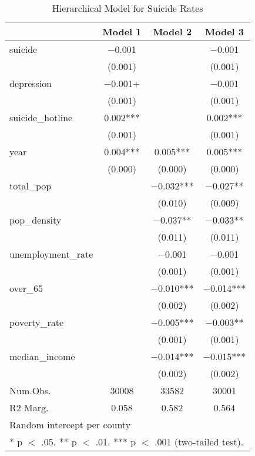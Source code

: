 \begin{table}[!h]

\caption{\label{tab:suicide_analysis}Hierarchical Model for Suicide Rates}
\centering
\fontsize{8}{10}\selectfont

\begin{tabular}{lccc}
\toprule
  & Model 1 & Model 2 & Model 3\\
\midrule

suicide & \num{-0.001} &  & \num{-0.001}\\
 & (\num{0.001}) &  & \vphantom{2} (\num{0.001})\\
depression & \num{-0.001}+ &  & \num{-0.001}\\
 & (\num{0.001}) &  & \vphantom{1} (\num{0.001})\\
suicide\_hotline & \num{0.002}*** &  & \num{0.002}***\\
 & (\num{0.001}) &  & (\num{0.001})\\
year & \num{0.004}*** & \num{0.005}*** & \num{0.005}***\\
 & (\num{0.000}) & (\num{0.000}) & (\num{0.000})\\
total\_pop &  & \num{-0.032}*** & \num{-0.027}**\\
 &  & (\num{0.010}) & (\num{0.009})\\
pop\_density &  & \num{-0.037}** & \num{-0.033}**\\
 &  & (\num{0.011}) & (\num{0.011})\\
unemployment\_rate &  & \num{-0.001} & \num{-0.001}\\
 &  & (\num{0.001}) & \vphantom{1} (\num{0.001})\\
over\_65 &  & \num{-0.010}*** & \num{-0.014}***\\
 &  & (\num{0.002}) & \vphantom{1} (\num{0.002})\\
poverty\_rate &  & \num{-0.005}*** & \num{-0.003}**\\
 &  & (\num{0.001}) & (\num{0.001})\\
median\_income &  & \num{-0.014}*** & \num{-0.015}***\\
 &  & (\num{0.002}) & (\num{0.002})\\
\midrule
Num.Obs. & \num{30008} & \num{33582} & \num{30001}\\
R2 Marg. & \num{0.058} & \num{0.582} & \num{0.564}\\
\bottomrule
\multicolumn{4}{l}{\rule{0pt}{1em}Random intercept per county}\\
\multicolumn{4}{l}{\rule{0pt}{1em}* p $<$ .05. ** p $<$ .01. *** p $<$ .001 (two-tailed test).}\\
\end{tabular}
\end{table}